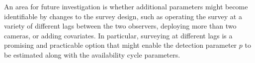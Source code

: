 \documentclass[useAMS, usenatbib, referee]{biom}\usepackage[]{graphicx}\usepackage[]{color}
\begin{document}
An area for future investigation is whether additional parameters might become identifiable by changes to the survey design, such as operating the survey at a variety of different lags between the two observers, deploying more than two cameras, or adding covariates. In particular, surveying at different lags is a promising and practicable option that might enable the detection parameter $p$ to be estimated along with the availability cycle parameters.







\end{document}
